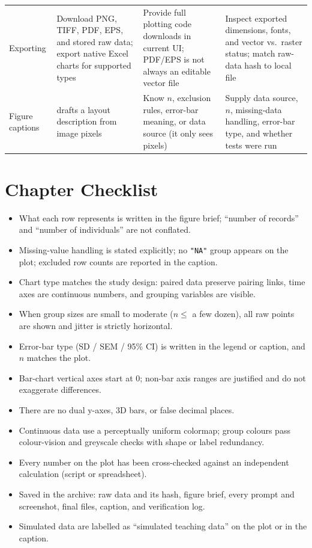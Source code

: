\begin{table}[htbp]
\begin{tabularx}{\linewidth}{@{}>{\raggedright\arraybackslash}p{19mm}YYY@{}}
Exporting & Download PNG, TIFF, PDF, EPS, and stored raw data; export native Excel charts for supported types & Provide full plotting code downloads in current UI; PDF/EPS is not always an editable vector file & Inspect exported dimensions, fonts, and vector vs.\ raster status; match raw-data hash to local file \\
Figure captions &  drafts a layout description from image pixels & Know $n$, exclusion rules, error-bar meaning, or data source (it only sees pixels) & Supply data source, $n$, missing-data handling, error-bar type, and whether tests were run \\
\bottomrule
\end{tabularx}
\end{table}

\section{Chapter Checklist}

\begin{itemize}
\item What each row represents is written in the figure brief; ``number of records'' and ``number of individuals'' are not conflated.
\item Missing-value handling is stated explicitly; no \texttt{"NA"} group appears on the plot; excluded row counts are reported in the caption.
\item Chart type matches the study design: paired data preserve pairing links, time axes are continuous numbers, and grouping variables are visible.
\item When group sizes are small to moderate ($n \le$ a few dozen), all raw points are shown and jitter is strictly horizontal.
\item Error-bar type (SD / SEM / 95\% CI) is written in the legend or caption, and $n$ matches the plot.
\item Bar-chart vertical axes start at $0$; non-bar axis ranges are justified and do not exaggerate differences.
\item There are no dual y-axes, 3D bars, or false decimal places.
\item Continuous data use a perceptually uniform colormap; group colours pass colour-vision and greyscale checks with shape or label redundancy.
\item Every number on the plot has been cross-checked against an independent calculation (script or spreadsheet).
\item Saved in the archive: raw data and its hash, figure brief, every prompt and screenshot, final files, caption, and verification log.
\item Simulated data are labelled as ``simulated teaching data'' on the plot or in the caption.
\end{itemize}

